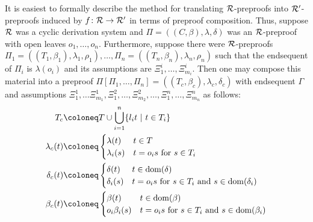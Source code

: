 It is easiest to formally describe the method for translating $\mathcal{R}$-preproofs into
$\mathcal{R}'$-preproofs induced by $f \colon \mathcal{R} \to \mathcal{R}'$ in terms of preproof composition.
Thus, suppose $\mathcal{R}$ was a cyclic derivation system and $\Pi = ((C, \beta), \lambda,
\delta)$ was an $\mathcal{R}$-preproof with open leaves $o_1, \ldots, o_n$. Furthermore,
suppose there were $\mathcal{R}$-preproofs $\Pi_1=((T_1, \beta_1), \lambda_1, \rho_1),
\ldots, \Pi_n = ((T_n, \beta_n), \lambda_n, \rho_n)$ such that the endsequent of
$\Pi_i$ is $\lambda(o_i)$ and its assumptions are $\Xi^i_1, \ldots, \Xi^i_{m_i}$.
Then one may compose this material into a preproof $\Pi[\Pi_1, \ldots, \Pi_n] = ((T_c,
\beta_c), \lambda_c, \delta_c)$ with endsequent $\Gamma$ and assumptions 
$\Xi^1_1, \ldots \Xi^1_{m_1}, \Xi^2_1, \ldots,
\Xi^2_{m_2}, \ldots, \Xi^n_{1}, \ldots, \Xi^n_{m_n}$ as follows:
\begin{align*}
  T_c & \coloneq T \cup \bigcup_{i = 1}^n \{l_i t ~|~ t \in T_i\} \\
  \lambda_c(t) & \coloneq
                 \begin{cases}
                   \lambda(t) & t \in T \\
                   \lambda_i(s) & t = o_i s \text{ for } s \in T_i
                 \end{cases} \\
  \delta_c(t) & \coloneq
                \begin{cases}
                  \delta(t) & t \in \dom(\delta) \\
                  \delta_i(s) & t = o_i s \text{ for } s \in T_i \text{ and } s \in \dom(\delta_i)
                \end{cases} \\
  \beta_c(t) & \coloneq
                \begin{cases}
                  \beta(t) & t \in \dom(\beta) \\
                  o_i \beta_i(s) & t = o_i s \text{ for } s \in T_i \text{ and } s \in \dom(\beta_i)
                \end{cases}
\end{align*}

